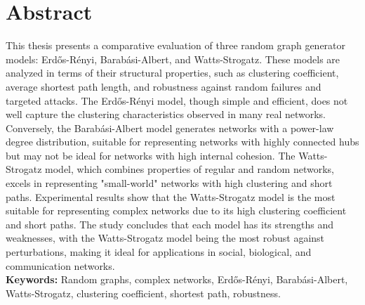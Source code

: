 \chapter*{\centering \normalsize Abstract}
This thesis presents a comparative evaluation of three random graph generator models: Erdős-Rényi, Barabási-Albert, and Watts-Strogatz. 
These models are analyzed in terms of their structural properties, such as clustering coefficient, average shortest path length, and robustness against 
random failures and targeted attacks. The Erdős-Rényi model, though simple and efficient, does not well capture the clustering characteristics observed in many 
real networks. Conversely, the Barabási-Albert model generates networks with a power-law degree distribution, suitable for representing networks with highly 
connected hubs but may not be ideal for networks with high internal cohesion. The Watts-Strogatz model, which combines properties of regular and random networks, 
excels in representing "small-world" networks with high clustering and short paths. Experimental results show that the Watts-Strogatz model is the most suitable for representing 
complex networks due to its high clustering coefficient and short paths. The study concludes that each model has its strengths and weaknesses, with the Watts-Strogatz model being
 the most robust against perturbations, making it ideal for applications in social, biological, and communication networks.\\
\textbf{Keywords:} Random graphs, complex networks, Erdős-Rényi, Barabási-Albert, Watts-Strogatz, clustering coefficient, shortest path, robustness.

